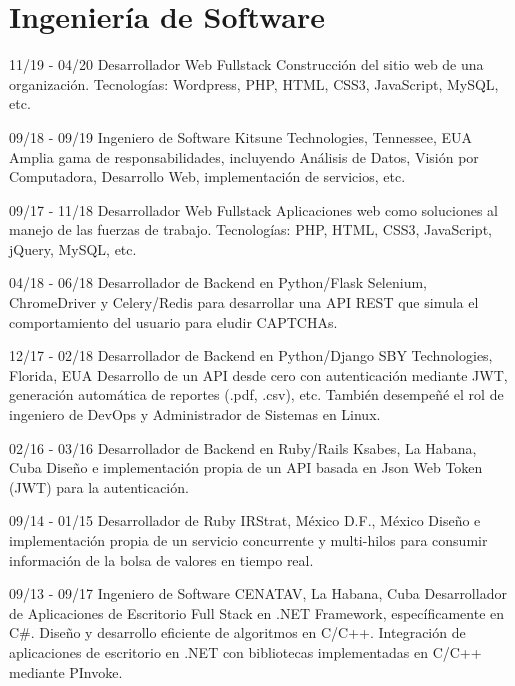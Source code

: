 \documentclass[]{friggeri-cv}
\begin{document}
\section{Ingeniería de Software}
\begin{entrylist}
  \entry
    {11/19 - 04/20}
    {Desarrollador Web Fullstack}
    {}
    {Construcción del sitio web de una organización. Tecnologías: Wordpress, PHP, HTML, CSS3, JavaScript, MySQL, etc.\\}

  \entry
    {09/18 - 09/19}
    {Ingeniero de Software}
    {Kitsune Technologies, Tennessee, EUA}   
    {Amplia gama de responsabilidades, incluyendo Análisis de Datos, Visión por Computadora, Desarrollo Web, implementación de servicios, etc.\\}

  \entry
    {09/17 - 11/18}
    {Desarrollador Web Fullstack}
    {}
    {Aplicaciones web como soluciones al manejo de las fuerzas de trabajo. Tecnologías: PHP, HTML, CSS3, JavaScript, jQuery, MySQL, etc.\\}
    
  \entry
    {04/18 - 06/18}
    {Desarrollador de Backend en Python/Flask}
    {} 
    {Selenium, ChromeDriver y Celery/Redis para desarrollar una API REST que simula el comportamiento del usuario para eludir CAPTCHAs.\\}     

  \entry
    {12/17 - 02/18}
    {Desarrollador de Backend en Python/Django}
    {SBY Technologies, Florida, EUA}
    {Desarrollo de un API desde cero con autenticación mediante JWT, generación automática de reportes (.pdf, .csv), etc. También desempeñé el rol de ingeniero de DevOps y Administrador de Sistemas en Linux.\\}
    
  \entry
    {02/16 - 03/16}
    {Desarrollador de Backend en Ruby/Rails}
    {Ksabes, La Habana, Cuba}
    {Diseño e implementación propia de un API basada en Json Web Token (JWT) para la autenticación.\\}

  \entry
    {09/14 - 01/15}
    {Desarrollador de Ruby}
    {IRStrat, México D.F., México}
    {Diseño e implementación propia de un servicio concurrente y multi-hilos para consumir información de la bolsa de valores en tiempo real.\\}

  \entry
    {09/13 - 09/17}
    {Ingeniero de Software}
    {CENATAV, La Habana, Cuba}
    {Desarrollador de Aplicaciones de Escritorio Full Stack en .NET Framework, específicamente en C\#. Diseño y desarrollo eficiente de algoritmos en C/C++. Integración de aplicaciones de escritorio en .NET con bibliotecas implementadas en C/C++ mediante PInvoke.\\}    
    
\end{entrylist}
\end{document}
